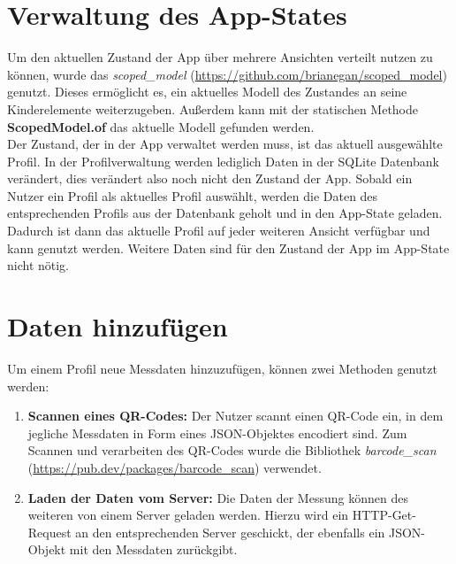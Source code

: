 	\section{Verwaltung des App-States}
	\label{sec:verwaltungAppState}
	
	Um den aktuellen Zustand der App über mehrere Ansichten verteilt nutzen zu können, wurde das \textit{scoped\_model} (\url{https://github.com/brianegan/scoped_model}) genutzt. Dieses ermöglicht es, ein aktuelles Modell des Zustandes an seine Kinderelemente weiterzugeben. Außerdem kann mit der statischen Methode \textbf{ScopedModel.of} das aktuelle Modell gefunden werden.
	\\
	Der Zustand, der in der App verwaltet werden muss, ist das aktuell ausgewählte Profil. In der Profilverwaltung werden lediglich Daten in der SQLite Datenbank verändert, dies verändert also noch nicht den Zustand der App. Sobald ein Nutzer ein Profil als aktuelles Profil auswählt, werden die Daten des entsprechenden Profils aus der Datenbank geholt und in den App-State geladen. Dadurch ist dann das aktuelle Profil auf jeder weiteren Ansicht verfügbar und kann genutzt werden. Weitere Daten sind für den Zustand der App im App-State nicht nötig.
	
	\section{Daten hinzufügen}
	\label{sec:addData}
	
	Um einem Profil neue Messdaten hinzuzufügen, können zwei Methoden genutzt werden:
	
	\begin{enumerate}
		\item \textbf{Scannen eines QR-Codes:} Der Nutzer scannt einen QR-Code ein, in dem jegliche Messdaten in Form eines JSON-Objektes encodiert sind. Zum Scannen und verarbeiten des QR-Codes wurde die Bibliothek \textit{barcode\_scan} (\url{https://pub.dev/packages/barcode_scan}) verwendet.
		\item \textbf{Laden der Daten vom Server:} Die Daten der Messung können des weiteren von einem Server geladen werden. Hierzu wird ein HTTP-Get-Request an den entsprechenden Server geschickt, der ebenfalls ein JSON-Objekt mit den Messdaten zurückgibt.
	\end{enumerate}	
	
